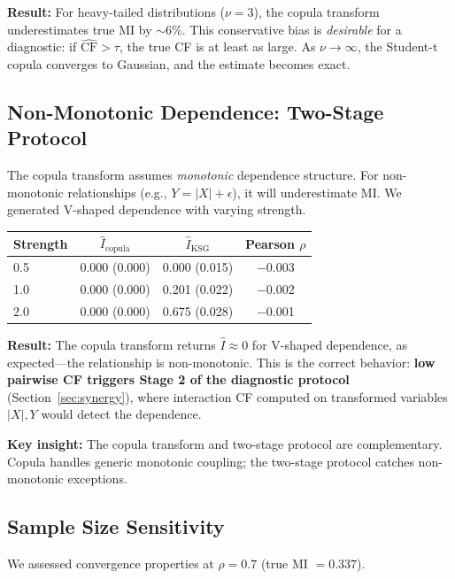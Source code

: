 \documentclass[10pt]{article} %
\theoremstyle{plain}
\theoremstyle{definition}
\newcommand{\CF}{\mathrm{CF}}
\newcommand{\MI}{I}
\begin{document}
\textbf{Result:} For heavy-tailed distributions ($\nu = 3$), the copula transform underestimates true MI by $\sim$6\%. This conservative bias is \emph{desirable} for a diagnostic: if $\widehat{\CF} > \tau$, the true CF is at least as large. As $\nu \to \infty$, the Student-t copula converges to Gaussian, and the estimate becomes exact.

\subsection{Non-Monotonic Dependence: Two-Stage Protocol}

The copula transform assumes \emph{monotonic} dependence structure. For non-monotonic relationships (e.g., $Y = |X| + \epsilon$), it will underestimate MI. We generated V-shaped dependence with varying strength.

\begin{center}
\begin{tabular}{lccc}
\toprule
Strength & $\widehat{\MI}_{\text{copula}}$ & $\widehat{\MI}_{\text{KSG}}$ & Pearson $\rho$ \\
\midrule
0.5 & 0.000 (0.000) & 0.000 (0.015) & $-$0.003 \\
1.0 & 0.000 (0.000) & 0.201 (0.022) & $-$0.002 \\
2.0 & 0.000 (0.000) & 0.675 (0.028) & $-$0.001 \\
\bottomrule
\end{tabular}
\end{center}

\textbf{Result:} The copula transform returns $\widehat{\MI} \approx 0$ for V-shaped dependence, as expected---the relationship is non-monotonic. This is the correct behavior: \textbf{low pairwise CF triggers Stage 2 of the diagnostic protocol} (Section~\ref{sec:synergy}), where interaction CF computed on transformed variables $|X|, Y$ would detect the dependence.

\textbf{Key insight:} The copula transform and two-stage protocol are complementary. Copula handles generic monotonic coupling; the two-stage protocol catches non-monotonic exceptions.

\subsection{Sample Size Sensitivity}

We assessed convergence properties at $\rho = 0.7$ (true MI $= 0.337$).
\end{document}

